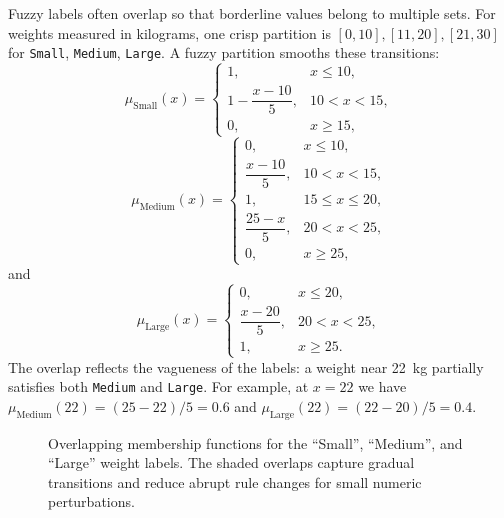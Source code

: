 Fuzzy labels often overlap so that borderline values belong to multiple sets. For weights measured in kilograms, one crisp partition is \([0,10],[11,20],[21,30]\) for \texttt{Small}, \texttt{Medium}, \texttt{Large}. A fuzzy partition smooths these transitions:
\[
\mu_{\text{Small}}(x) =
\begin{cases}
    1, & x \leq 10, \\
    1 - \dfrac{x-10}{5}, & 10 < x < 15, \\
    0, & x \geq 15,
\end{cases}
\]
\[
\mu_{\text{Medium}}(x) =
\begin{cases}
    0, & x \leq 10, \\
    \dfrac{x-10}{5}, & 10 < x < 15, \\
    1, & 15 \leq x \leq 20, \\
    \dfrac{25-x}{5}, & 20 < x < 25, \\
    0, & x \geq 25,
\end{cases}
\]
and
\[
\mu_{\text{Large}}(x) =
\begin{cases}
    0, & x \leq 20, \\
    \dfrac{x-20}{5}, & 20 < x < 25, \\
    1, & x \geq 25.
\end{cases}
\]
The overlap reflects the vagueness of the labels: a weight near 22~kg partially satisfies both \texttt{Medium} and \texttt{Large}.
For example, at \(x=22\) we have \(\mu_{\text{Medium}}(22)=(25-22)/5=0.6\) and \(\mu_{\text{Large}}(22)=(22-20)/5=0.4\).

\begin{figure}[t]
    \centering
    \caption[Overlapping membership functions for Small/Medium/Large labels]{Overlapping membership functions for the ``Small'', ``Medium'', and ``Large'' weight labels. The shaded overlaps capture gradual transitions and reduce abrupt rule changes for small numeric perturbations.}
    \label{fig:lec9-membership-overlap}
\end{figure}

